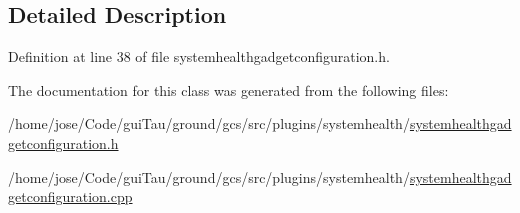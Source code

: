 \subsection{Detailed Description}


Definition at line 38 of file systemhealthgadgetconfiguration.\-h.



The documentation for this class was generated from the following files\-:\begin{DoxyCompactItemize}
\item 
/home/jose/\-Code/gui\-Tau/ground/gcs/src/plugins/systemhealth/\hyperlink{systemhealthgadgetconfiguration_8h}{systemhealthgadgetconfiguration.\-h}\item 
/home/jose/\-Code/gui\-Tau/ground/gcs/src/plugins/systemhealth/\hyperlink{systemhealthgadgetconfiguration_8cpp}{systemhealthgadgetconfiguration.\-cpp}\end{DoxyCompactItemize}
